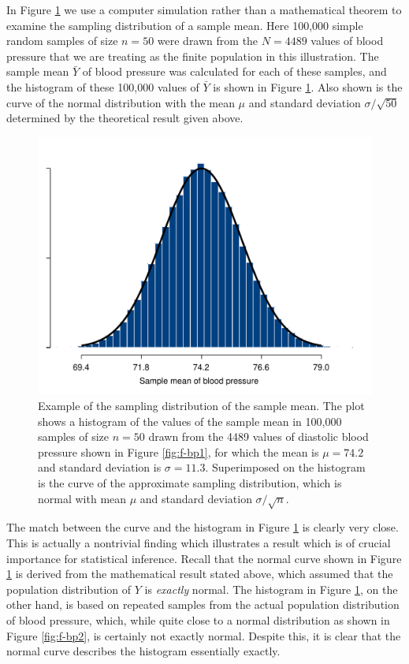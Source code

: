 \documentclass[11pt,a4paper,openany]{book}
\begin{document}
In Figure \ref{fig:f-sampld} we use a computer simulation rather than a
mathematical theorem to examine the sampling distribution of a sample
mean. Here 100,000 simple random samples of size \(n=50\) were drawn
from the \(N=4489\) values of blood pressure that we are treating as the
finite population in this illustration. The sample mean \(\bar{Y}\) of
blood pressure was calculated for each of these samples, and the
histogram of these 100,000 values of \(\bar{Y}\) is shown in Figure
\ref{fig:f-sampld}. Also shown is the curve of the normal distribution
with the mean \(\mu\) and standard deviation \(\sigma/\sqrt{50}\)
determined by the theoretical result given above.

\begin{figure}[htbp]
\centering
\includegraphics[width=12.00000cm]{sampld1_bp.pdf}
\caption{\label{fig:f-sampld} Example of the sampling distribution of the
sample mean. The plot shows a histogram of the values of the sample mean
in 100,000 samples of size \(n=50\) drawn from the 4489 values of
diastolic blood pressure shown in Figure \ref{fig:f-bp1}, for which the
mean is \(\mu=74.2\) and standard deviation is \(\sigma=11.3\).
Superimposed on the histogram is the curve of the approximate sampling
distribution, which is normal with mean \(\mu\) and standard deviation
\(\sigma/\sqrt{n}\).}
\end{figure}

The match between the curve and the histogram in Figure
\ref{fig:f-sampld} is clearly very close. This is actually a nontrivial
finding which illustrates a result which is of crucial importance for
statistical inference. Recall that the normal curve shown in Figure
\ref{fig:f-sampld} is derived from the mathematical result stated above,
which assumed that the population distribution of \(Y\) is
\emph{exactly} normal. The histogram in Figure \ref{fig:f-sampld}, on
the other hand, is based on repeated samples from the actual population
distribution of blood pressure, which, while quite close to a normal
distribution as shown in Figure \ref{fig:f-bp2}, is certainly not
exactly normal. Despite this, it is clear that the normal curve
describes the histogram essentially exactly.
\end{document}

